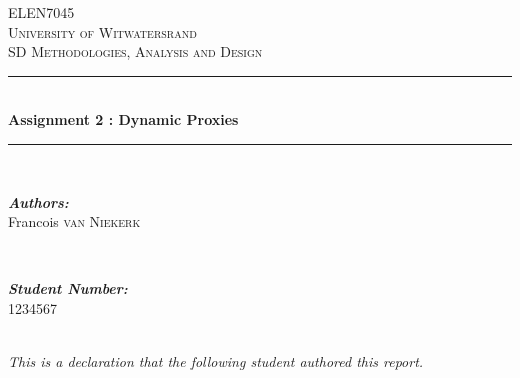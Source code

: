 \documentclass[10pt, onecolumn]{witseiepaper}
\begin{document}
\begin{titlepage}
	
	\newcommand{\HRule}{\rule{\linewidth}{0.5mm}} 
	
	\begin{center}
		
		\textsc{\LARGE ELEN7045}\\[0.5cm]
		
		\textsc{\Large University of Witwatersrand}\\[0.25cm]
		
		\textsc{\large SD Methodologies, Analysis and Design}\\[0.5cm]
		
		\HRule \\[0.4cm]
		{ \huge \bfseries Assignment 2 : Dynamic Proxies}\\[0.25cm]
		
		\HRule \\[1.25cm]
		\begin{minipage}
			{0.4
				\textwidth} 
			\begin{flushleft}
				\large \emph{\textbf{Authors:}}\\
				Francois  \textsc{van Niekerk} \\
			\end{flushleft}
		\end{minipage}
		~ 
		\begin{minipage}
			{0.4
				\textwidth} 
			\begin{flushright}
				\large \emph{\textbf{Student Number:}} \\
				1234567  \\
			\end{flushright}
		\end{minipage}
		
		\begin{minipage}
			{1	\textwidth} 
			\begin{flushright}
				\center\large{\textit{\\This is a declaration that the following student authored this report.}} \\
			\end{flushright}
		\end{minipage}\\[2cm]
		

\end{center}
\end{titlepage}
\end{document}

